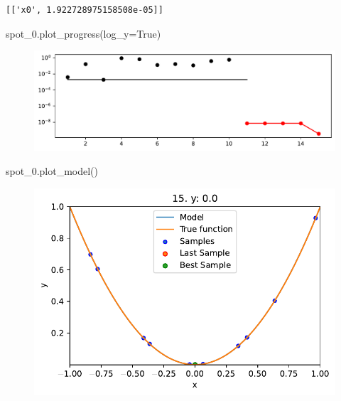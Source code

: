 \documentclass[
  letterpaper,
  DIV=11,
  numbers=noendperiod]{scrreprt}
\newenvironment{Shaded}{\begin{snugshade}}{\end{snugshade}}
\newcommand{\NormalTok}[1]{\textcolor[rgb]{0.00,0.23,0.31}{#1}}
\newcommand{\OperatorTok}[1]{\textcolor[rgb]{0.37,0.37,0.37}{#1}}
\newcommand{\VariableTok}[1]{\textcolor[rgb]{0.07,0.07,0.07}{#1}}
\begin{document}
\begin{verbatim}
[['x0', 1.922728975158508e-05]]
\end{verbatim}

\begin{Shaded}
\begin{Highlighting}[]
\NormalTok{spot\_0.plot\_progress(log\_y}\OperatorTok{=}\VariableTok{True}\NormalTok{)}
\end{Highlighting}
\end{Shaded}

\begin{figure}[H]

{\centering \includegraphics{01_spot_intro_files/figure-pdf/cell-8-output-1.pdf}

}

\end{figure}

\begin{Shaded}
\begin{Highlighting}[]
\NormalTok{spot\_0.plot\_model()}
\end{Highlighting}
\end{Shaded}

\begin{figure}[H]

{\centering \includegraphics{01_spot_intro_files/figure-pdf/cell-9-output-1.pdf}

}

\end{figure}
\end{document}
